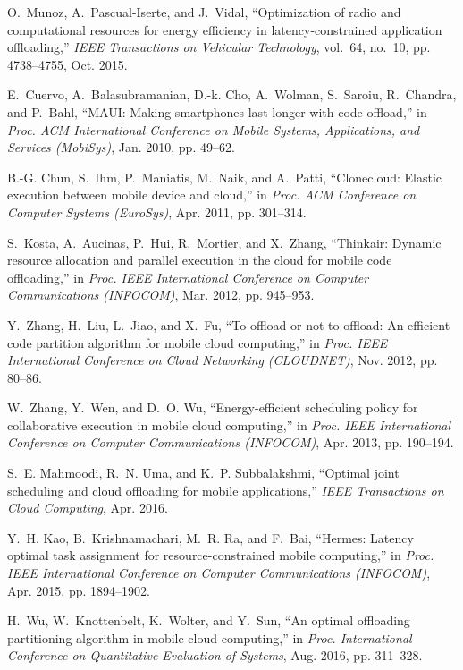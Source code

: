 \documentclass[10pt,journal,compsoc]{IEEEtran}
\begin{document}
{\begin{thebibliography}{10}
O.~Munoz, A.~Pascual-Iserte, and J.~Vidal, ``Optimization of radio and
  computational resources for energy efficiency in latency-constrained
  application offloading,'' \emph{IEEE Transactions on Vehicular Technology},
  vol.~64, no.~10, pp. 4738--4755, Oct. 2015.

E.~Cuervo, A.~Balasubramanian, D.-k. Cho, A.~Wolman, S.~Saroiu, R.~Chandra, and
  P.~Bahl, ``{MAUI}: Making smartphones last longer with code offload,'' in
  \emph{Proc. ACM International Conference on Mobile Systems, Applications, and
  Services (MobiSys)}, Jan. 2010, pp. 49--62.

B.-G. Chun, S.~Ihm, P.~Maniatis, M.~Naik, and A.~Patti, ``Clonecloud: Elastic
  execution between mobile device and cloud,'' in \emph{Proc. ACM Conference on
  Computer Systems (EuroSys)}, Apr. 2011, pp. 301--314.

S.~Kosta, A.~Aucinas, P.~Hui, R.~Mortier, and X.~Zhang, ``Thinkair: Dynamic
  resource allocation and parallel execution in the cloud for mobile code
  offloading,'' in \emph{Proc. IEEE International Conference on Computer
  Communications (INFOCOM)}, Mar. 2012, pp. 945--953.

Y.~Zhang, H.~Liu, L.~Jiao, and X.~Fu, ``To offload or not to offload: An
  efficient code partition algorithm for mobile cloud computing,'' in
  \emph{Proc. IEEE International Conference on Cloud Networking (CLOUDNET)},
  Nov. 2012, pp. 80--86.

W.~Zhang, Y.~Wen, and D.~O. Wu, ``Energy-efficient scheduling policy for
  collaborative execution in mobile cloud computing,'' in \emph{Proc. IEEE
  International Conference on Computer Communications (INFOCOM)}, Apr. 2013,
  pp. 190--194.

S.~E. Mahmoodi, R.~N. Uma, and K.~P. Subbalakshmi, ``Optimal joint scheduling
  and cloud offloading for mobile applications,'' \emph{IEEE Transactions on
  Cloud Computing}, Apr. 2016.

Y.~H. Kao, B.~Krishnamachari, M.~R. Ra, and F.~Bai, ``Hermes: Latency optimal
  task assignment for resource-constrained mobile computing,'' in \emph{Proc.
  IEEE International Conference on Computer Communications (INFOCOM)}, Apr.
  2015, pp. 1894--1902.

H.~Wu, W.~Knottenbelt, K.~Wolter, and Y.~Sun, ``An optimal offloading
  partitioning algorithm in mobile cloud computing,'' in \emph{Proc.
  International Conference on Quantitative Evaluation of Systems}, Aug. 2016,
  pp. 311--328.


\end{thebibliography}}
\end{document}
